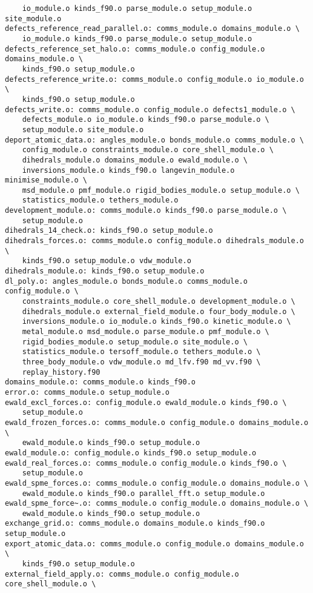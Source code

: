 \begin{verbatim}
	io_module.o kinds_f90.o parse_module.o setup_module.o site_module.o
defects_reference_read_parallel.o: comms_module.o domains_module.o \
	io_module.o kinds_f90.o parse_module.o setup_module.o
defects_reference_set_halo.o: comms_module.o config_module.o domains_module.o \
	kinds_f90.o setup_module.o
defects_reference_write.o: comms_module.o config_module.o io_module.o \
	kinds_f90.o setup_module.o
defects_write.o: comms_module.o config_module.o defects1_module.o \
	defects_module.o io_module.o kinds_f90.o parse_module.o \
	setup_module.o site_module.o
deport_atomic_data.o: angles_module.o bonds_module.o comms_module.o \
	config_module.o constraints_module.o core_shell_module.o \
	dihedrals_module.o domains_module.o ewald_module.o \
	inversions_module.o kinds_f90.o langevin_module.o minimise_module.o \
	msd_module.o pmf_module.o rigid_bodies_module.o setup_module.o \
	statistics_module.o tethers_module.o
development_module.o: comms_module.o kinds_f90.o parse_module.o \
	setup_module.o
dihedrals_14_check.o: kinds_f90.o setup_module.o
dihedrals_forces.o: comms_module.o config_module.o dihedrals_module.o \
	kinds_f90.o setup_module.o vdw_module.o
dihedrals_module.o: kinds_f90.o setup_module.o
dl_poly.o: angles_module.o bonds_module.o comms_module.o config_module.o \
	constraints_module.o core_shell_module.o development_module.o \
	dihedrals_module.o external_field_module.o four_body_module.o \
	inversions_module.o io_module.o kinds_f90.o kinetic_module.o \
	metal_module.o msd_module.o parse_module.o pmf_module.o \
	rigid_bodies_module.o setup_module.o site_module.o \
	statistics_module.o tersoff_module.o tethers_module.o \
	three_body_module.o vdw_module.o md_lfv.f90 md_vv.f90 \
	replay_history.f90
domains_module.o: comms_module.o kinds_f90.o
error.o: comms_module.o setup_module.o
ewald_excl_forces.o: config_module.o ewald_module.o kinds_f90.o \
	setup_module.o
ewald_frozen_forces.o: comms_module.o config_module.o domains_module.o \
	ewald_module.o kinds_f90.o setup_module.o
ewald_module.o: config_module.o kinds_f90.o setup_module.o
ewald_real_forces.o: comms_module.o config_module.o kinds_f90.o \
	setup_module.o
ewald_spme_forces.o: comms_module.o config_module.o domains_module.o \
	ewald_module.o kinds_f90.o parallel_fft.o setup_module.o
ewald_spme_force~.o: comms_module.o config_module.o domains_module.o \
	ewald_module.o kinds_f90.o setup_module.o
exchange_grid.o: comms_module.o domains_module.o kinds_f90.o setup_module.o
export_atomic_data.o: comms_module.o config_module.o domains_module.o \
	kinds_f90.o setup_module.o
external_field_apply.o: comms_module.o config_module.o core_shell_module.o \

\end{verbatim}
